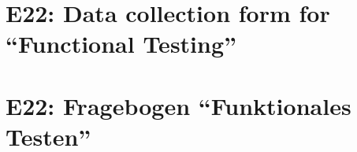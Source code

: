 
\thispagestyle{empty}
\ifenglish
\section*{E22: Data collection form for ``Functional Testing''}

\fi
\ifgerman
\section*{E22: Fragebogen "`Funktionales Testen"'}

\fi


